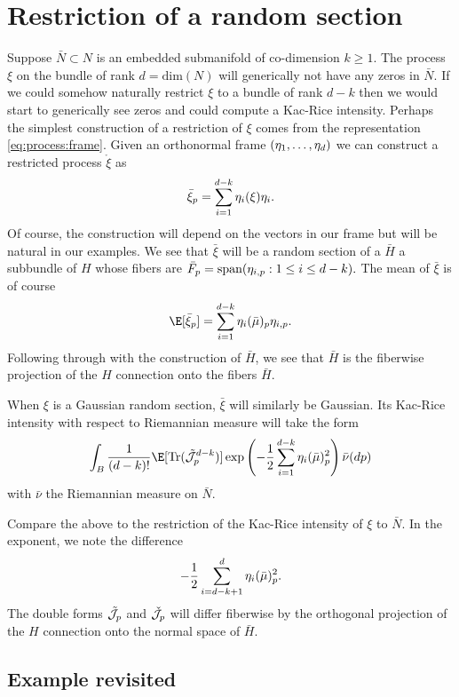 \documentclass{article}
\newcommand{\randsec}{\xi}
\newcommand{\linprocess}{\mathring{\randsec}}
\newcommand{\meansec}{\bar{\mu}}
\begin{document}
\section{Restriction of a random section}

Suppose $\bar{N} \subset N$ is an embedded submanifold of co-dimension $k \geq 1$. The process $\randsec$ on the bundle of rank
$d=\text{dim}(N)$ will generically not have any zeros in $\bar{N}$. If we could somehow naturally restrict
$\randsec$ to a bundle of rank $d-k$ then we would start to generically see zeros and could compute a
Kac-Rice intensity. Perhaps the simplest construction of a restriction of $\randsec$ comes from the representation
\eqref{eq:process:frame}. Given an orthonormal frame $(\eta_1, \dots, \eta_d)$ we can construct a restricted process
$\linprocess$ as
$$
\bar{\randsec}_p = \sum_{i=1}^{d-k} \ONF_i(\randsec) \ONF_i.
$$
Of course, the construction will depend on the vectors in our frame but will be natural in our examples. We see that
$\bar{\randsec}$ will be a random section of a $\bar{H}$ a subbundle of $H$ whose fibers are 
$\bar{F}_p = \text{span}(\eta_{i,p}:1 \leq i \leq d-k).$ The mean of $\bar{\randsec}$ is of course
$$
\E[\bar{\randsec}_p] = \sum_{i=1}^{d-k} \ONF_i(\meansec)_p \ONF_{i,p}.
$$
Following through with the construction of  $\bar{H}$, we see that
$\bar{H}$ is the fiberwise projection of the $H$ connection onto the fibers $\bar{H}$.

When $\randsec$ is a Gaussian random section, $\bar{\randsec}$ will similarly be Gaussian. Its Kac-Rice
intensity with respect to Riemannian measure will take the form
\begin{equation}
  \label{eq:kac:rice:restriction}
\int_B \frac{1}{(d-k)!}\E[ \text{Tr}(\tilde{\cal J}_p^{d-k})] \exp\left(-\frac{1}{2} \sum_{i=1}^{d-k} \ONF_i(\meansec)_p^2\right) \bar{\nu}(dp)
\end{equation}
with $\bar{\nu}$ the Riemannian measure on $\bar{N}$.

Compare the above to the restriction of the Kac-Rice intensity of $\randsec$ to $\bar{N}$. In the exponent,
we note the difference
$$
-\frac{1}{2}\sum_{i=d-k+1}^d \ONF_i(\meansec)_p^2.
$$
The double forms $\tilde{\cal J}_p$ and $\check{\cal J}_p$ will differ fiberwise by the orthogonal projection of the
$H$ connection onto the normal space of $\bar{H}$.

\subsection{Example revisited}
\end{document}
